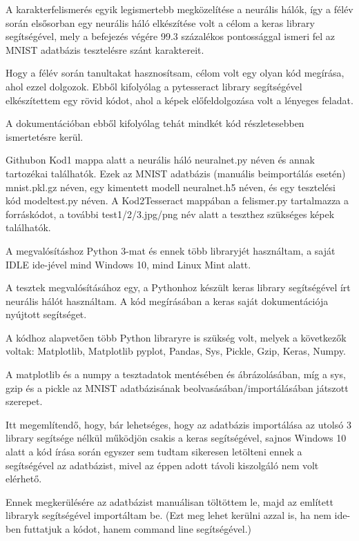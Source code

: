 \documentclass[hidelinks,12pt,a4paper]{report}
\begin{document}
A karakterfelismerés egyik legismertebb megközelítése a neurális hálók, így a félév során elsősorban egy neurális háló elkészítése volt a célom a keras library segítségével, mely a befejezés végére 99.3 százalékos pontossággal ismeri fel az MNIST adatbázis tesztelésre szánt karaktereit.

Hogy a félév során tanultakat hasznosítsam, célom volt egy olyan kód megírása, ahol ezzel dolgozok. Ebből kifolyólag a pytesseract library segítségével elkészítettem egy rövid kódot, ahol a képek előfeldolgozása volt a lényeges feladat.

A dokumentációban ebből kifolyólag tehát mindkét kód részletesebben ismertetésre kerül.

Githubon Kod1 mappa alatt a neurális háló neuralnet.py néven és annak tartozékai találhatók. Ezek az MNIST adatbázis (manuális beimportálás esetén) mnist.pkl.gz néven, egy kimentett modell neuralnet.h5 néven, és egy tesztelési kód modeltest.py néven.
A Kod2Tesseract mappában a felismer.py tartalmazza a forráskódot, a további test1/2/3.jpg/png név alatt a teszthez szükséges képek találhatók.

A megvalósításhoz Python 3-mat és ennek több libraryjét használtam, a saját IDLE ide-jével mind Windows 10, mind Linux Mint alatt.

	

A tesztek megvalósításához egy, a Pythonhoz készült keras library segítségével írt neurális hálót használtam.
A kód megírásában a keras saját dokumentációja nyújtott segítséget.

A kódhoz alapvetően több Python libraryre is szükség volt, melyek a következők voltak:
Matplotlib, Matplotlib pyplot, Pandas, Sys, Pickle, Gzip, Keras, Numpy.

A matplotlib és a numpy a tesztadatok mentésében és ábrázolásában, míg a sys, gzip és a pickle az MNIST adatbázisának beolvasásában/importálásában játszott szerepet.

Itt megemlítendő, hogy, bár lehetséges, hogy az adatbázis importálása az utolsó 3 library segítsége nélkül működjön csakis a keras segítségével, sajnos Windows 10 alatt a kód írása során egyszer sem tudtam sikeresen letölteni ennek a segítségével az adatbázist, mivel az éppen adott távoli kiszolgáló nem volt elérhető.

Ennek megkerülésére az adatbázist manuálisan töltöttem le, majd az említett libraryk segítségével importáltam be.
(Ezt meg lehet kerülni azzal is, ha nem ide-ben futtatjuk a kódot, hanem command line segítségével.)
\end{document}

